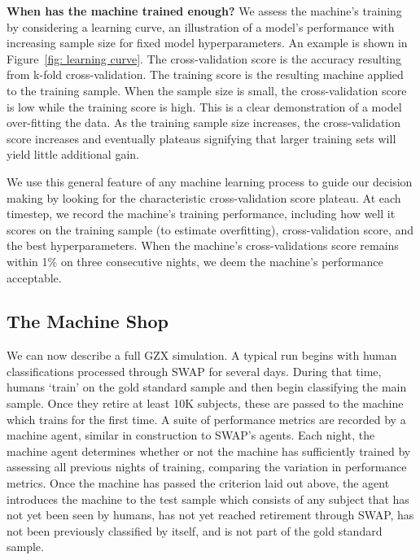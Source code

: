 \documentclass[twocolumn]{aastex6}
\begin{document}
\textbf{When has the machine trained enough?} 
We assess the machine's training by considering a learning curve, 
an illustration of a model's performance with increasing sample size for fixed 
model hyperparameters. An example is shown in Figure~\ref{fig: learning curve}.
 The cross-validation score is the accuracy resulting from k-fold cross-validation. 
The training score is the resulting machine applied to the training sample. 
When the sample size is small, the cross-validation score is low while the training score is high. 
This is a clear demonstration of a model over-fitting the data. 
As the training sample size increases, the cross-validation score increases and 
eventually plateaus signifying that 
larger training sets will  yield little additional gain. 

We use this general feature of any machine learning process to guide our 
decision making by looking for the characteristic 
cross-validation score plateau. At each timestep, we record
the machine's training performance, including how well it scores on the 
training sample (to estimate overfitting), cross-validation score, 
and the best hyperparameters. When the machine's 
cross-validations score remains within 1\% on three consecutive nights, 
we deem the machine's performance acceptable. 


\subsection{The Machine Shop}\label{sec: machine shop}
We can now describe a full GZX simulation. A typical run begins with human classifications 
processed through SWAP for several days. During that time, humans `train' on the 
gold standard sample and then begin classifying the main sample.  Once they retire 
at least 10K subjects, these are passed to the machine which trains for the first time. 
A suite of performance metrics are recorded by a machine agent, similar
in construction to SWAP's agents. Each night, the machine agent determines 
whether or not the machine has sufficiently trained by assessing all previous nights of 
training, comparing the variation in performance metrics. Once the machine has
passed the criterion laid out above, the agent introduces the machine to the test sample
which consists of any subject that has not yet been seen by humans, has not yet 
reached retirement through SWAP, has not been previously classified by itself, 
and is not part of the gold standard sample.  
\end{document}
